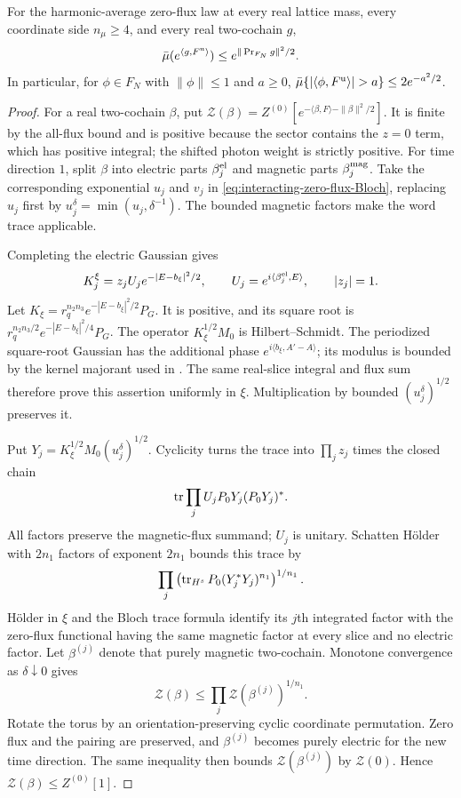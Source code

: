 \begin{proposition}\label{prop:interacting-zero-flux-domination}
For the harmonic-average zero-flux law at every
real lattice mass, every coordinate side
$n_\mu\ge4$, and every real two-cochain $g$,
\begin{equation}\label{eq:interacting-zero-flux-Gaussian}
 \bar\mu(e^{\langle g,F^{\rm u}\rangle})
                  \le e^{\|\operatorname{Pr}_{F_N}g\|^2/2}.
\end{equation}
In particular, for $\phi\in F_N$ with
$\|\phi\|\le1$ and $a\ge0$,
$\bar\mu\{|\langle\phi,F^{\rm u}\rangle|>a\}\le2e^{-a^2/2}$.
\end{proposition}

\begin{proof}
For a real two-cochain $\beta$, put $\mathcal Z(\beta)=
Z^{(0)}[e^{-\langle\beta,F\rangle-\|\beta\|^2/2}]$.
It is finite by the all-flux bound and is
positive because the sector contains the
$z=0$ term, which has positive integral;
the shifted photon weight is strictly positive.
For time direction $1$, split $\beta$
into electric parts $\beta_j^{\rm el}$ and
magnetic parts $\beta_j^{\rm mag}$.
Take the corresponding exponential $u_j$
and $v_j$ in
\eqref{eq:interacting-zero-flux-Bloch}, replacing
$u_j$ first by $u_j^\delta=\min(u_j,\delta^{-1})$.
The bounded magnetic factors make the
word trace applicable.

Completing the electric Gaussian gives
\[
 K_j^\xi=z_jU_j e^{-|E-b_\xi|^2/2},\qquad
 U_j=e^{i\langle\beta_j^{\rm el},E\rangle},\qquad
 |z_j|=1 .
\]
Let $K_\xi=r_q^{n_2n_3}e^{-|E-b_\xi|^2/2}P_G$.
It is positive, and its square root is
$r_q^{n_2n_3/2}e^{-|E-b_\xi|^2/4}P_G$.
The operator $K_\xi^{1/2}M_0$ is Hilbert--Schmidt.
The periodized square-root Gaussian has the
additional phase $e^{i\langle b_\xi,A'-A\rangle}$;
its modulus is bounded by the kernel majorant
used in \cite[(83)]{ChamberLattice}.
The same real-slice integral and flux sum
therefore prove this assertion uniformly
in $\xi$. Multiplication by bounded
$(u_j^\delta)^{1/2}$ preserves it.

Put $Y_j=K_\xi^{1/2}M_0(u_j^\delta)^{1/2}$.
Cyclicity turns the trace into
$\prod_jz_j$ times the closed chain
\[
 \operatorname{tr}\prod_j U_jP_0Y_j(P_0Y_j)^*.
\]
All factors preserve the magnetic-flux
summand; $U_j$ is unitary. Schatten Hölder
\cite[slides~53--56]{PongeSchatten2025}
with $2n_1$ factors of exponent $2n_1$
bounds this trace by
\[
 \prod_j\left(\operatorname{tr}_{H^s}P_0(Y_j^*Y_j)^{n_1}\right)^{1/n_1}.
\]
Hölder in $\xi$ and the Bloch trace formula
identify its $j$th integrated factor with
the zero-flux functional having the same
magnetic factor at every slice and no
electric factor. Let $\beta^{(j)}$ denote
that purely magnetic two-cochain. Monotone
convergence as $\delta\downarrow0$ gives
\[
 \mathcal Z(\beta)\le
                \prod_j\mathcal Z(\beta^{(j)})^{1/n_1}.
\]
Rotate the torus by an orientation-preserving
cyclic coordinate permutation. Zero flux
and the pairing are preserved, and
$\beta^{(j)}$ becomes purely electric for
the new time direction. The same inequality
then bounds $\mathcal Z(\beta^{(j)})$
by $\mathcal Z(0)$. Hence
$\mathcal Z(\beta)\le Z^{(0)}[1]$.


\end{proof}
